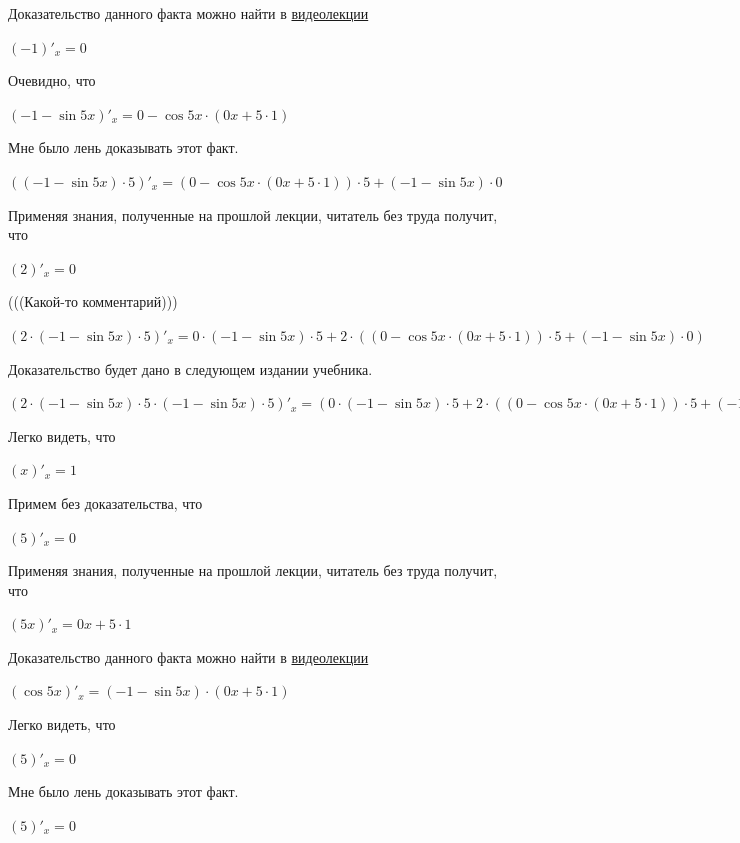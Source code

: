 \documentclass[12pt,a4paper,fleqn]{article}
\theoremstyle{definition}
\begin{document}
Доказательство данного факта можно найти в \href{https://www.youtube.com/watch?v=dQw4w9WgXcQ}{видеолекции} 

$( -1 )'_{x} =  0 $

Очевидно, что 

$( -1  - \sin 5  x )'_{x} =  0  - \cos 5  x  \cdot ( 0  x  +  5  \cdot  1 )$

Мне было лень доказывать этот факт.

$(( -1  - \sin 5  x ) \cdot  5 )'_{x} = ( 0  - \cos 5  x  \cdot ( 0  x  +  5  \cdot  1 )) \cdot  5  + ( -1  - \sin 5  x ) \cdot  0 $

Применяя знания, полученные на прошлой лекции, читатель без труда получит, что 

$( 2 )'_{x} =  0 $

(((Какой-то комментарий))) 

$( 2  \cdot ( -1  - \sin 5  x ) \cdot  5 )'_{x} =  0  \cdot ( -1  - \sin 5  x ) \cdot  5  +  2  \cdot (( 0  - \cos 5  x  \cdot ( 0  x  +  5  \cdot  1 )) \cdot  5  + ( -1  - \sin 5  x ) \cdot  0 )$

Доказательство будет дано в следующем издании учебника. 

$( 2  \cdot ( -1  - \sin 5  x ) \cdot  5  \cdot ( -1  - \sin 5  x ) \cdot  5 )'_{x} = ( 0  \cdot ( -1  - \sin 5  x ) \cdot  5  +  2  \cdot (( 0  - \cos 5  x  \cdot ( 0  x  +  5  \cdot  1 )) \cdot  5  + ( -1  - \sin 5  x ) \cdot  0 )) \cdot ( -1  - \sin 5  x ) \cdot  5  +  2  \cdot ( -1  - \sin 5  x ) \cdot  5  \cdot (( 0  - \cos 5  x  \cdot ( 0  x  +  5  \cdot  1 )) \cdot  5  + ( -1  - \sin 5  x ) \cdot  0 )$

Легко видеть, что 

$( x )'_{x} =  1 $

Примем без доказательства, что 

$( 5 )'_{x} =  0 $

Применяя знания, полученные на прошлой лекции, читатель без труда получит, что 

$( 5  x )'_{x} =  0  x  +  5  \cdot  1 $

Доказательство данного факта можно найти в \href{https://www.youtube.com/watch?v=dQw4w9WgXcQ}{видеолекции} 

$(\cos 5  x )'_{x} = ( -1  - \sin 5  x ) \cdot ( 0  x  +  5  \cdot  1 )$

Легко видеть, что 

$( 5 )'_{x} =  0 $

Мне было лень доказывать этот факт.

$( 5 )'_{x} =  0 $
\end{document}
